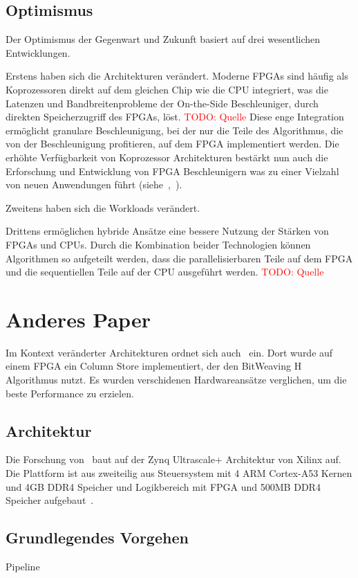 \documentclass[conference]{IEEEtran}
\newcommand{\todo}[1]{\textcolor{red}{TODO: #1}}
\begin{document}
\subsection{Optimismus}
Der Optimismus der Gegenwart und Zukunft basiert auf drei wesentlichen Entwicklungen.

Erstens haben sich die Architekturen verändert. Moderne FPGAs sind häufig als Koprozessoren direkt auf dem gleichen Chip wie die CPU integriert,
was die Latenzen und Bandbreitenprobleme der On-the-Side Beschleuniger, durch direkten Speicherzugriff des FPGAs, löst. \todo{Quelle}
Diese enge Integration ermöglicht granulare Beschleunigung, bei der nur die Teile des Algorithmus, die von der Beschleunigung profitieren,
auf dem FPGA implementiert werden. Die erhöhte Verfügbarkeit von Koprozessor Architekturen bestärkt nun auch die Erforschung und Entwicklung
von FPGA Beschleunigern was zu einer Vielzahl von neuen Anwendungen führt (siehe~\cite{lisa_column_2018},~\cite{sidler_accelerating_2017}).


Zweitens haben sich die Workloads verändert.

Drittens ermöglichen hybride Ansätze eine bessere Nutzung der Stärken von FPGAs und CPUs. Durch die Kombination beider Technologien
können Algorithmen so aufgeteilt werden, dass die parallelisierbaren Teile auf dem FPGA und die sequentiellen Teile auf der CPU ausgeführt werden.
\todo{Quelle}


\section{Anderes Paper} %
Im Kontext veränderter Architekturen ordnet sich auch~\cite{lisa_column_2018} ein. Dort wurde auf einem FPGA ein Column Store implementiert, der
den BitWeaving H Algorithmus nutzt. Es wurden verschidenen Hardwareansätze verglichen, um die beste Performance zu erzielen.

\subsection{Architektur}
Die Forschung von~\cite{lisa_column_2018} baut auf der Zynq Ultrascale+ Architektur von Xilinx auf. Die Plattform ist aus zweiteilig aus Steuersystem mit
4 ARM Cortex-A53 Kernen und 4GB DDR4 Speicher und Logikbereich mit FPGA und 500MB DDR4 Speicher aufgebaut~\cite{lisa_column_2018}.

\subsection{Grundlegendes Vorgehen}
Pipeline
\end{document}
